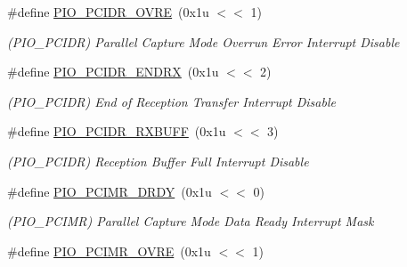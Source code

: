\begin{DoxyCompactItemize}
\mbox{\label{group__SAME70__PIO_gadd79e56caf9c1c59a364466206a4d032}} 
\#define \mbox{\hyperlink{group__SAME70__PIO_gadd79e56caf9c1c59a364466206a4d032}{P\+I\+O\+\_\+\+P\+C\+I\+D\+R\+\_\+\+O\+V\+RE}}~(0x1u $<$$<$ 1)
\begin{DoxyCompactList}\small\item\em (P\+I\+O\+\_\+\+P\+C\+I\+DR) Parallel Capture Mode Overrun Error Interrupt Disable \end{DoxyCompactList}\item 
\mbox{\label{group__SAME70__PIO_gad5d0348ece536d02949596cdd018675b}} 
\#define \mbox{\hyperlink{group__SAME70__PIO_gad5d0348ece536d02949596cdd018675b}{P\+I\+O\+\_\+\+P\+C\+I\+D\+R\+\_\+\+E\+N\+D\+RX}}~(0x1u $<$$<$ 2)
\begin{DoxyCompactList}\small\item\em (P\+I\+O\+\_\+\+P\+C\+I\+DR) End of Reception Transfer Interrupt Disable \end{DoxyCompactList}\item 
\mbox{\label{group__SAME70__PIO_ga994060bd48c7cd20b85a4dd1a624eb4d}} 
\#define \mbox{\hyperlink{group__SAME70__PIO_ga994060bd48c7cd20b85a4dd1a624eb4d}{P\+I\+O\+\_\+\+P\+C\+I\+D\+R\+\_\+\+R\+X\+B\+U\+FF}}~(0x1u $<$$<$ 3)
\begin{DoxyCompactList}\small\item\em (P\+I\+O\+\_\+\+P\+C\+I\+DR) Reception Buffer Full Interrupt Disable \end{DoxyCompactList}\item 
\mbox{\label{group__SAME70__PIO_ga03ee08b548c54753bd2186d6f72f5582}} 
\#define \mbox{\hyperlink{group__SAME70__PIO_ga03ee08b548c54753bd2186d6f72f5582}{P\+I\+O\+\_\+\+P\+C\+I\+M\+R\+\_\+\+D\+R\+DY}}~(0x1u $<$$<$ 0)
\begin{DoxyCompactList}\small\item\em (P\+I\+O\+\_\+\+P\+C\+I\+MR) Parallel Capture Mode Data Ready Interrupt Mask \end{DoxyCompactList}\item 
\mbox{\label{group__SAME70__PIO_gaad07af8efbc91d85035d14d99941a9c5}} 
\#define \mbox{\hyperlink{group__SAME70__PIO_gaad07af8efbc91d85035d14d99941a9c5}{P\+I\+O\+\_\+\+P\+C\+I\+M\+R\+\_\+\+O\+V\+RE}}~(0x1u $<$$<$ 1)
$$
\end{DoxyCompactItemize}
